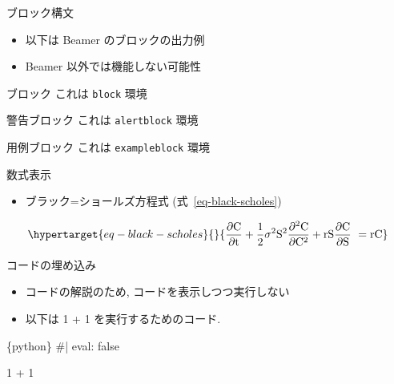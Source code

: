 \documentclass[
  ignorenonframetext,
]{beamer}
\newenvironment{Shaded}{\begin{snugshade}}{\end{snugshade}}
\newcommand{\CommentTok}[1]{\textcolor[rgb]{0.37,0.37,0.37}{#1}}
\newcommand{\DecValTok}[1]{\textcolor[rgb]{0.68,0.00,0.00}{#1}}
\newcommand{\NormalTok}[1]{\textcolor[rgb]{0.00,0.48,0.65}{#1}}
\newcommand{\OperatorTok}[1]{\textcolor[rgb]{0.37,0.37,0.37}{#1}}
\providecommand{\tightlist}{%
  \setlength{\itemsep}{0pt}\setlength{\parskip}{0pt}}
\begin{document}
\begin{frame}[fragile]{ブロック構文}
\protect\hypertarget{ux30d6ux30edux30c3ux30afux69cbux6587}{}
\begin{itemize}
\tightlist
\item
  以下は Beamer のブロックの出力例
\item
  Beamer 以外では機能しない可能性
\end{itemize}

\begin{alertblock}{ブロック}
これは \texttt{block} 環境

\end{alertblock}

\begin{alertblock}{警告ブロック}
これは \texttt{alertblock} 環境

\end{alertblock}

\begin{exampleblock}{用例ブロック}
これは \texttt{exampleblock} 環境

\end{exampleblock}
\end{frame}

\begin{frame}{数式表示}
\protect\hypertarget{ux6570ux5f0fux8868ux793a}{}
\begin{itemize}
\tightlist
\item
  ブラック=ショールズ方程式 (式~\ref{eq-black-scholes})
\end{itemize}

\begin{equation}\protect\hypertarget{eq-black-scholes}{}{
\frac{\partial \mathrm C}{ \partial \mathrm t } + \frac{1}{2}\sigma^{2} \mathrm S^{2}
\frac{\partial^{2} \mathrm C}{\partial \mathrm C^2}
  + \mathrm r \mathrm S \frac{\partial \mathrm C}{\partial \mathrm S}\ =
  \mathrm r \mathrm C 
}\label{eq-black-scholes}\end{equation}
\end{frame}

\begin{frame}[fragile]{コードの埋め込み}
\protect\hypertarget{ux30b3ux30fcux30c9ux306eux57cbux3081ux8fbcux307f}{}
\begin{itemize}
\tightlist
\item
  コードの解説のため, コードを表示しつつ実行しない
\item
  以下は 1 + 1 を実行するためのコード.
\end{itemize}

\begin{Shaded}
\begin{Highlighting}[]
\NormalTok{\textasciigrave{}\textasciigrave{}\textasciigrave{}\{python\}}
\CommentTok{\#| eval: false}

\DecValTok{1} \OperatorTok{+} \DecValTok{1}
\NormalTok{\textasciigrave{}\textasciigrave{}\textasciigrave{}}
\end{Highlighting}
\end{Shaded}
\end{frame}
\end{document}
